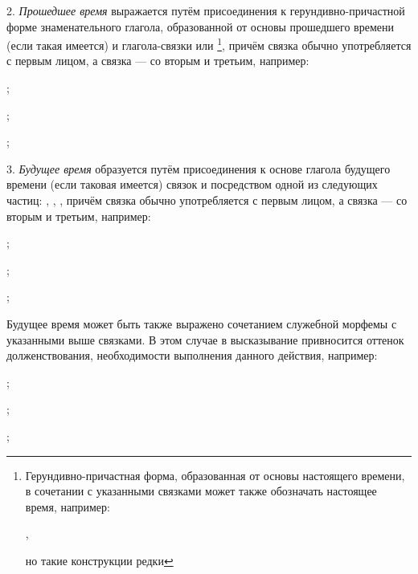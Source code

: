 2. \emph{Прошедшее время} выражается путём присоединения к герун\-див\-но-при\-част\-ной форме знаменательного глагола, образованной от основы прошедшего времени (если такая имеется) и глагола-связки  или \footnote[38]{Герундивно-причастная форма, образованная от основы настоящего времени, в сочетании с указанными связками может также обозначать настоящее время, например:
\begin{prfsample}
	\item {},
\end{prfsample}
но такие конструкции редки},
причём связка  обычно употребляется с первым лицом, а связка  --- со вторым и третьим, например:
\begin{prfsample}
	\item {};
	\item {};
	\item {};
\end{prfsample}

3. \emph{Будущее время} образуется путём присоединения к основе глагола будущего времени (если таковая имеется) связок  и  посредством одной из следующих частиц: , , , причём связка
 обычно употребляется с первым лицом, а связка  --- со вторым и третьим, например:
\begin{prfsample}
	\item {};
	\item {};
	\item {};
\end{prfsample}

Будущее время может быть также выражено сочетанием служебной морфемы  с указанными выше связками. В этом случае в высказывание привносится оттенок долженствования, необходимости выполнения данного действия, например:
\begin{prfsample}
	\item{};
	\item{};
	\item{};
\end{prfsample}

